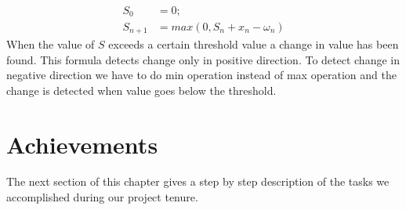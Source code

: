 \begin{align}
S_0 &= 0; \nonumber \\
S_{n+1} &= max(0, S_n + x_n - \omega_n) \nonumber
\end{align}
When the value of $S$ exceeds a certain threshold value a change in value has 
been found. This formula detects change only in positive direction. To detect 
change in negative direction we have to do min operation instead of max 
operation and the change  is detected when value goes below the threshold.







\section{Achievements}
The next section of this chapter gives a step by step description of the tasks we 
accomplished during our project tenure. 


